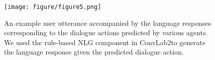 \documentclass[letterpaper]{article} %
\begin{document}
\begin{figure}
    \centering
    \texttt{[image: figure/figure5.png]}
    \caption{An example user utterance accompanied by the language responses corresponding to the dialogue actions predicted by various agents. We used the rule-based NLG component in ConvLab2\footnotemark to generate the language response given the predicted dialogue action.}
    \vspace{-1.5em}
    \label{fig:case_extract}
    
\end{figure}


\end{document}
